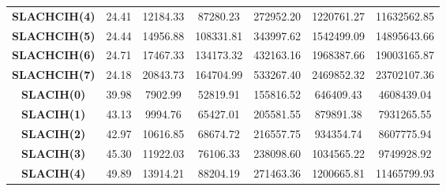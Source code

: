 \begin{landscape}
{\begin{table}[]
{\begin{tabular}{|c|cccccc|}
\textbf{SLACHCIH(4)}                 & 24.41                         & 12184.33                       & 87280.23                       & 272952.20                      & 1220761.27                     & 11632562.85                     \\
\rowcolor[HTML]{EFEFEF} 
\textbf{SLACHCIH(5)}                 & 24.44                         & 14956.88                       & 108331.81                      & 343997.62                      & 1542499.09                     & 14895643.66                     \\
\textbf{SLACHCIH(6)}                 & 24.71                         & 17467.33                       & 134173.32                      & 432163.16                      & 1968387.66                     & 19003165.87                     \\
\rowcolor[HTML]{EFEFEF} 
\textbf{SLACHCIH(7)}                 & 24.18                         & 20843.73                       & 164704.99                      & 533267.40                      & 2469852.32                     & 23702107.36                     \\
\textbf{SLACIH(0)}                   & 39.98                         & 7902.99                        & 52819.91                       & 155816.52                      & 646409.43                      & 4608439.04                      \\
\rowcolor[HTML]{EFEFEF} 
\textbf{SLACIH(1)}                   & 43.13                         & 9994.76                        & 65427.01                       & 205581.55                      & 879891.38                      & 7931265.55                      \\
\textbf{SLACIH(2)}                   & 42.97                         & 10616.85                       & 68674.72                       & 216557.75                      & 934354.74                      & 8607775.94                      \\
\rowcolor[HTML]{EFEFEF} 
\textbf{SLACIH(3)}                   & 45.30                         & 11922.03                       & 76106.33                       & 238098.60                      & 1034565.22                     & 9749928.92                      \\
\textbf{SLACIH(4)}                   & 49.89                         & 13914.21                       & 88204.19                       & 271463.36                      & 1200665.81                     & 11465799.93                     \\

\end{tabular}}
\end{table}}
\end{landscape}
